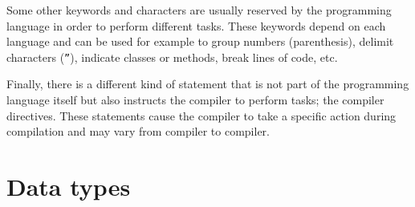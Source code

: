 Some other keywords and characters are usually reserved by the programming language in order to perform different tasks. 
These keywords depend on each language and can be used for example to 
group numbers (parenthesis), 
delimit characters (\texttt{''}), 
indicate classes or methods,
break lines of code, etc.

Finally, there is a different kind of statement that is not part of the programming language itself 
but also instructs the compiler to perform tasks; the compiler directives. 
These statements cause the compiler to take a specific action during compilation and may vary from compiler to compiler.












    \section{Data types}
    
